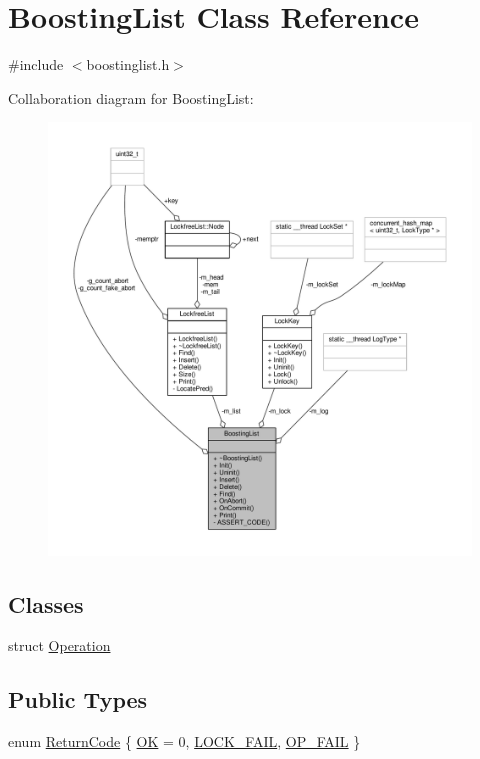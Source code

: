 \hypertarget{classBoostingList}{\section{Boosting\-List Class Reference}
\label{classBoostingList}
}


{\ttfamily \#include $<$boostinglist.\-h$>$}



Collaboration diagram for Boosting\-List\-:
\nopagebreak
\begin{figure}[H]
\begin{center}
\leavevmode
\includegraphics[width=350pt]{classBoostingList__coll__graph}
\end{center}
\end{figure}
\subsection*{Classes}
\begin{DoxyCompactItemize}
\item 
struct \hyperlink{structBoostingList_1_1Operation}{Operation}
\end{DoxyCompactItemize}
\subsection*{Public Types}
\begin{DoxyCompactItemize}
\item 
enum \hyperlink{classBoostingList_abcaa163088b2562f0704b16a56a4a97a}{Return\-Code} \{ \hyperlink{classBoostingList_abcaa163088b2562f0704b16a56a4a97aac1960f3674b94b1c1eeed892292aca31}{O\-K} = 0, 
\hyperlink{classBoostingList_abcaa163088b2562f0704b16a56a4a97aabce3ccb23056e3e2c72add59309c1d4d}{L\-O\-C\-K\-\_\-\-F\-A\-I\-L}, 
\hyperlink{classBoostingList_abcaa163088b2562f0704b16a56a4a97aa9cb78d0fc6f0581698b7220a64ee83e3}{O\-P\-\_\-\-F\-A\-I\-L}
 \}
\end{DoxyCompactItemize}
